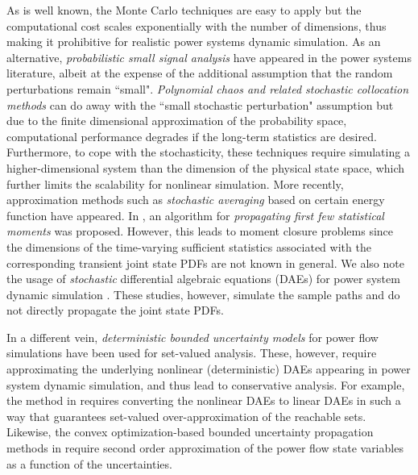 \documentclass[10pt,twocolumn]{IEEEtran}
\begin{document}
 As is well known, the Monte Carlo techniques are easy to apply but the computational cost scales exponentially with the number of dimensions, thus making it prohibitive for realistic power systems dynamic simulation. As an alternative, \emph{probabilistic small signal analysis} \cite{nwankpa1992stochastic,rueda2009assessment,huang2013quasi,dhople2013analysis} have appeared in the power systems literature, albeit at the expense of the additional assumption that the random perturbations remain ``small". \emph{Polynomial chaos and related stochastic collocation methods} \cite{hockenberry2004evaluation,xu2019propagating} can do away with the ``small stochastic perturbation" assumption but due to the finite dimensional approximation of the probability space, computational performance degrades if the long-term statistics are desired. Furthermore, to cope with the stochasticity, these techniques require simulating a higher-dimensional system than the dimension of the physical state space, which further limits the scalability for nonlinear simulation. More recently, approximation methods such as \emph{stochastic averaging} \cite{ju2018analytical,ju2018stochastic} based on certain energy function \cite{pai1989energy,chang1995direct,sauerpai1998} have appeared. In \cite{maldonado2018uncertainty}, an algorithm for \emph{propagating first few statistical moments} was proposed. However, this leads to moment closure problems since the dimensions of the time-varying sufficient statistics associated with the corresponding transient joint state PDFs are not known in general. We also note the usage of \emph{stochastic} differential algebraic equations (DAEs) for power system dynamic simulation \cite{wang2011numerical,milano2013systematic}. These studies, however, simulate the sample paths and do not directly propagate the joint state PDFs.

In a different vein, \emph{deterministic bounded uncertainty models} for power flow simulations have been used \cite{dimitrovski2004boundary,hiskens2006sensitivity,chen2012method,althoff2014formal,geng2020reach} for set-valued analysis. These, however, require approximating the underlying nonlinear (deterministic) DAEs appearing in power system dynamic simulation, and thus lead to conservative analysis. For example, the method in \cite{althoff2014formal} requires converting the nonlinear DAEs to linear DAEs in such a way that guarantees set-valued over-approximation of the reachable sets. Likewise, the convex optimization-based bounded uncertainty propagation methods in \cite{choi2017propagating,choi2018propagating} require second order approximation of the power flow state variables as a function of the uncertainties.
\end{document}
